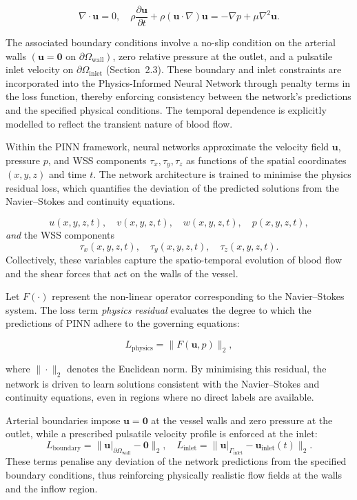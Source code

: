 \documentclass{article}
\begin{document}
\begin{equation}
\nabla \cdot \mathbf{u} = 0, 
\quad
\rho \frac{\partial \mathbf{u}}{\partial t} + \rho (\mathbf{u} \cdot \nabla)\mathbf{u}
= -\nabla p + \mu \nabla^2 \mathbf{u}.
\label{eq:navier_stokes}
\end{equation}

The associated boundary conditions involve a no-slip condition on the arterial walls \((\mathbf{u}=\mathbf{0} \text{ on } \partial\Omega_{\text{wall}})\), zero relative pressure at the outlet, and a pulsatile inlet velocity on \(\partial\Omega_{\text{inlet}}\) (Section~2.3). These boundary and inlet constraints are incorporated into the Physics-Informed Neural Network through penalty terms in the loss function, thereby enforcing consistency between the network’s predictions and the specified physical conditions. The temporal dependence is explicitly modelled to reflect the transient nature of blood flow.

Within the PINN framework, neural networks approximate the velocity field \(\mathbf{u}\), pressure \(p\), and WSS components \(\tau_x, \tau_y, \tau_z\) as functions of the spatial coordinates \((x,y,z)\) and time \(t\). The network architecture is trained to minimise the physics residual loss, which quantifies the deviation of the predicted solutions from the Navier--Stokes and continuity equations. 

\[
    u(x,y,z,t),\quad v(x,y,z,t),\quad w(x,y,z,t),\quad p(x,y,z,t),
\]
\emph{and} the WSS components
\[
    \tau_x(x,y,z,t),\quad \tau_y(x,y,z,t),\quad \tau_z(x,y,z,t).
\]
Collectively, these variables capture the spatio-temporal evolution of blood flow and the shear forces that act on the walls of the vessel.

Let \(F(\cdot)\) represent the non-linear operator corresponding to the Navier--Stokes system. The loss term \emph{physics residual} evaluates the degree to which the predictions of PINN adhere to the governing equations:

\begin{equation}
L_{\mathrm{physics}} = \bigl\|F(\mathbf{u}, p)\bigr\|_2,
\end{equation}

where \(\|\cdot\|_2\) denotes the Euclidean norm. By minimising this residual, the network is driven to learn solutions consistent with the Navier--Stokes and continuity equations, even in regions where no direct labels are available.

Arterial boundaries impose \(\mathbf{u}=\mathbf{0}\) at the vessel walls and zero pressure at the outlet, while a prescribed pulsatile velocity profile is enforced at the inlet:
\begin{equation}
L_{\mathrm{boundary}} = \|\mathbf{u}\big|_{\partial\Omega_{\text{wall}}} - \mathbf{0}\|_2, 
\quad
L_{\mathrm{inlet}} = \|\mathbf{u}\big|_{\Gamma_{\mathrm{inlet}}} - \mathbf{u}_{\mathrm{inlet}}(t)\|_2.
\end{equation}
These terms penalise any deviation of the network predictions from the specified boundary conditions, thus reinforcing physically realistic flow fields at the walls and the inflow region.
\end{document}
